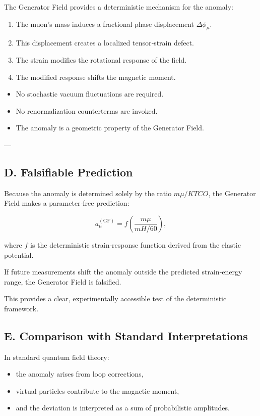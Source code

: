 \documentclass[reprint,amsmath,amssymb,aps,prl,floatfix]{revtex4-2}
\begin{document}
The Generator Field provides a deterministic mechanism for the anomaly:
\begin{enumerate}
\item The muon’s mass induces a fractional‑phase displacement \(\Delta\phi_\mu\).  
\item This displacement creates a localized tensor‑strain defect.  
\item The strain modifies the rotational response of the field.  
\item The modified response shifts the magnetic moment.  
\end{enumerate}
\medskip
\begin{itemize}
\item No stochastic vacuum fluctuations are required.  
\item No renormalization counterterms are invoked.  
\item The anomaly is a geometric property of the Generator Field.
\end{itemize}
---

\subsection{D. Falsifiable Prediction}

Because the anomaly is determined solely by the ratio \(m\mu / K{TCO}\), the Generator Field makes a parameter‑free prediction:

\[
a_\mu^{(\mathrm{GF})}
= f\!\left(\frac{m\mu}{mH/60}\right),
\]

where \(f\) is the deterministic strain‑response function derived from the elastic potential.
\medskip

If future measurements shift the anomaly outside the predicted strain‑energy range, the Generator Field is falsified.
\medskip

This provides a clear, experimentally accessible test of the deterministic framework.

\subsection{E. Comparison with Standard Interpretations}

In standard quantum field theory:
\begin{itemize}
\item the anomaly arises from loop corrections,  
\item virtual particles contribute to the magnetic moment,  
\item and the deviation is interpreted as a sum of probabilistic amplitudes.
\end{itemize}
\end{document}
